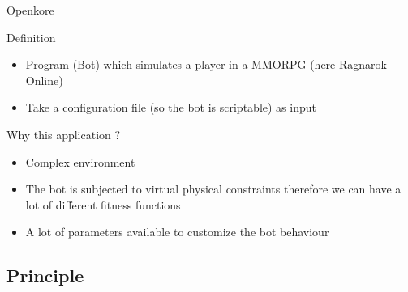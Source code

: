 \begin{frame}{Openkore}

  \begin{block}{Definition}
    \begin{itemize}
    \item Program (Bot) which simulates a player in a MMORPG (here Ragnarok Online)
    \item Take a configuration file (so the bot is scriptable) as input
    \end{itemize}
  \end{block}

  \begin{block}{Why this application ?}
    \begin{itemize}
    \item Complex environment
    \item The bot is subjected to virtual physical constraints therefore we can have a lot of different fitness functions
    \item A lot of parameters available to customize the bot behaviour
    \end{itemize}
  \end{block}

\end{frame}
\subsection{Principle}

